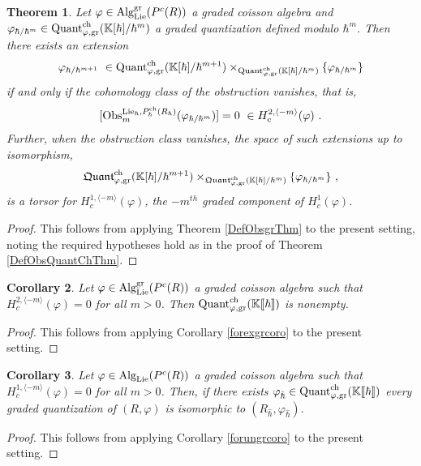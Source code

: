 \documentclass[11pt]{amsart}
\numberwithin{equation}{section}
\newtheorem{theo}{Theorem}[section]
\newtheorem{coro}[theo]{Corollary}
\theoremstyle{definition}
\newcommand{\bb}{\mathbb}
\newcommand{\fph}{{[\![\hbar]\!]}}
\newcommand{\gd}{{\textup{gr}}}
\newcommand{\K}{{\bb K}}
\newcommand{\ik}{{\bb K}}
\newcommand{\Obs}{{\textup{Obs}}}
\newcommand{\Quant}{{\textup{Quant}}}
\newcommand{\fQuant}{{\mathfrak{Quant}}}
\newcommand{\Alg}{{\textup{Alg}}}
\newcommand{\Lie}{{\textup{Lie}}}
\newcommand{\ch}{{\textup{ch}}}
\newcommand{\0}{{\textbf{0}}}
\def\ch{{\rm ch}}
\def \vph{\varphi_{\hat \hbar}}
\def \hhb{{\hat \hbar}}
\begin{document}
\begin{theo}\label{DefObsgrQuantChThm} Let $\varphi\in \Alg^\gd_{\Lie}(P^c(R))$ a graded coisson algebra and $\varphi_{\hbar/\hbar^{m}}\in \Quant_{\varphi,\gd}^\ch(\K[\hbar]/\hbar^{m}) $ a graded quantization defined modulo $\hbar^m$. Then there exists an extension
	\[ \varphi_{ \hbar / \hbar^{m+1}} \  \in \Quant_{\varphi,\gd}^\ch(\K[\hbar]/\hbar^{m+1}) \times_{\Quant^\ch_{\varphi,\gd}(\K[\hbar]/\hbar^{m}) } \{\varphi_{\hbar/\hbar^{m}} \}\]
	if and only if the cohomology class of the obstruction vanishes, that is,
	\[ [ \Obs^{\Lie_{\hbar}, P_{\hbar}^{\ch}(R_\hbar)}_m(\varphi_{\hbar/\hbar^{m}})]= 0 \ \in H^{2,\langle -m \rangle}_{c}(\varphi) \ .\]
	Further, when the obstruction class vanishes, the space of such extensions up to isomorphism,
	\[  \fQuant_{\varphi,\gd}^\ch(\K[\hbar]/\hbar^{m+1}) \times_{\fQuant^\ch_{\varphi,\gd}(\K[\hbar]/\hbar^{m}) } \{\varphi_{\hbar/\hbar^{m}} \} \ , \]
	is a torsor for $H^{1,\langle -m \rangle}_{c}(\varphi)$, the $-m^{th}$ graded component of $H^1_{c}(\varphi)$.
\end{theo}
\begin{proof}
	This follows from applying Theorem \ref{DefObsgrThm} to the present setting, noting the required hypotheses hold as in the proof of Theorem \ref{DefObsQuantChThm}.
\end{proof}


\begin{coro}  Let $\varphi\in \Alg^\gd_{\Lie}(P^c(R))$ a graded coisson algebra such that $H^{2,\langle-m \rangle}_{c}(\varphi)=0$ for all $m>0$. Then $\Quant^\ch_{\varphi,\gd}(\ik\fph)$ is nonempty.
\end{coro}
\begin{proof}
This follows from applying Corollary \ref{forexgrcoro} to the present setting.
\end{proof}

\begin{coro}\label{cor:unique graded quantization}
Let $\varphi\in \Alg_{\Lie}(P^c(R))$ a graded coisson algebra such that \mbox{$H^{1,\langle -m \rangle}_{c}(\varphi)=0$} for all $m>0$. Then, if there exists $\varphi_{\hat \hbar}\in\Quant^\ch_{\varphi,\gd}(\ik\fph)$ every graded quantization of $(R,\varphi)$ is isomorphic to $(R_\hhb, \vph)$.
\end{coro}
\begin{proof}
This follows from applying Corollary \ref{forungrcoro} to the present setting.
\end{proof}
\end{document}
